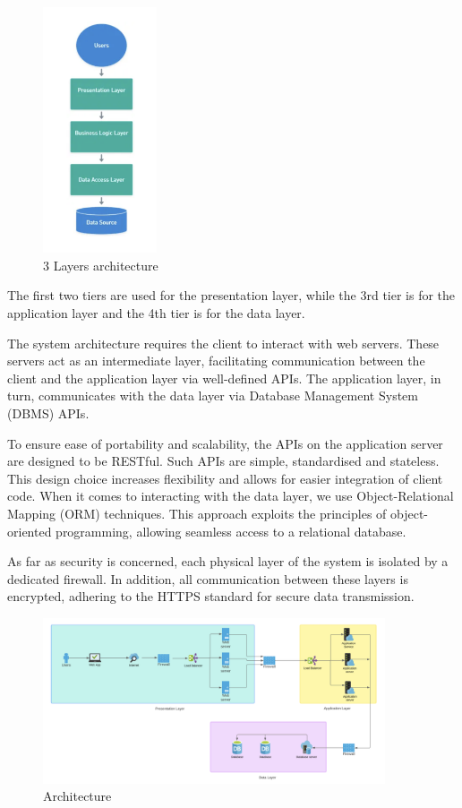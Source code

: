 \begin{figure}[H]
    \centering
    \includegraphics[width=0.3\textwidth]{Design/threeLayer.png}
    \caption{3 Layers architecture}
    \label{fig:enter-label}
\end{figure}


The first two tiers are used for the presentation layer, while the 3rd tier is for the application layer and the 4th tier is for the data layer.

The system architecture requires the client to interact with web servers. These servers act as an intermediate layer, facilitating communication between the client and the application layer via well-defined APIs. The application layer, in turn, communicates with the data layer via Database Management System (DBMS) APIs.

To ensure ease of portability and scalability, the APIs on the application server are designed to be RESTful. Such APIs are simple, standardised and stateless. This design choice increases flexibility and allows for easier integration of client code. When it comes to interacting with the data layer, we use Object-Relational Mapping (ORM) techniques. This approach exploits the principles of object-oriented programming, allowing seamless access to a relational database.

As far as security is concerned, each physical layer of the system is isolated by a dedicated firewall. In addition, all communication between these layers is encrypted, adhering to the HTTPS standard for secure data transmission.



\begin{figure}[H]
    \centering
    \includegraphics[width=0.9\textwidth]{Design/ArchitectureFinal.png}
    \caption{Architecture}
    \label{fig:enter-label}
\end{figure}


